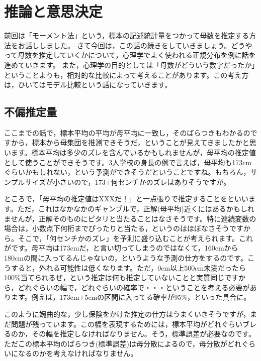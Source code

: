 \documentclass{ltjsbook}
\begin{document}
\chapter{推論と意思決定}
\label{chapter17}
前回は「モーメント法」という，標本の記述統計量をつかって母数を推定する方法をお話ししました。
さて今回は，この話の続きをしていきましょう。どうやって母数を推定していくかについて，心理学でよく使われる正規分布を例に話を進めていきます。
また，心理学の目的としては「母数がどういう数字だったか」ということよりも，相対的な比較によって考えることがあります。この考え方は，ひいてはモデル比較という話になっていきます。

\section{不偏推定量}
ここまでの話で，標本平均の平均が母平均に一致し，そのばらつきもわかるのですから，標本から母集団を推測できそうだ，ということが見えてきましたかと思います。標本平均は多少のズレを含んでいるかもしれませんが，母平均の推定値として使うことができそうです。3人学校の身長の例で言えば，母平均も173cmぐらいかもしれない，という予測ができそうだということですね。もちろん，サンプルサイズが小さいので，173$\pm$何センチかのズレはありそうですが。

ところで，「母平均の推定値はXXXだ！」と一点張りで推定することをといいます。ただ，これはなかなかのギャンブルで，正解(母平均)近くにはあるかもしれませんが，正解そのものにピタリと当たることはなさそうです。特に連続変数の場合は，小数点下何桁までぴったりと当たる，というのはほぼなさそうですから。そこで，「何センチかのズレ」を予測に盛り込むことが考えられます。これがです。母平均は173cmだ，と言い切ってしまうのではなくて，160cmから180cmの間に入ってるんじゃないの，というような予測の仕方をするのです。こうすると，外れる可能性は低くなります。ただ，0cm以上500cm未満だったら100\%当てられるぜ，という推定は何も推定していないことと実質同じですから，どれぐらいの幅で，どれぐらいの確率で・・・ということを考える必要があります。例えば，173cm$\pm$5cmの区間に入ってる確率が95\%，といった具合に。

このように婉曲的な，少し保険をかけた推定の仕方はうまくいきそうですが，まだ問題が残っています。この幅を表現するためには，標本平均がどれぐらいブレるのか，その幅を推定しなければなりません。そう，標準誤差が必要なのです。ただこの標本平均のばらつき(標準誤差)は母分散によるので，母分散がどれぐらいになるのかを考えなければなりません。
\end{document}
